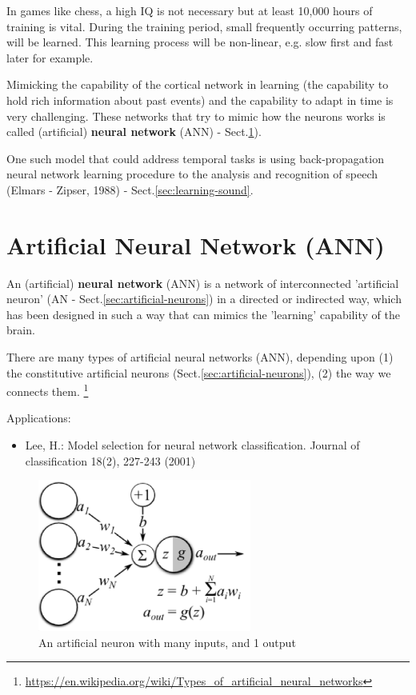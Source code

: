 In games like chess, a high IQ is not necessary but at least 10,000 hours of
training is vital. During the training period, small frequently occurring
patterns, will be learned. This learning process will be non-linear, e.g. slow
first and fast later for example.


Mimicking the capability of the cortical network in learning (the capability to
hold rich information about past events) and the capability to adapt in time is
very challenging. These networks that try to mimic how the neurons works is
called (artificial) {\bf neural network} (ANN) -
Sect.\ref{sec:ANN-articial-neuron-network}).


One such model that could address temporal tasks is using back-propagation
neural network learning procedure to the analysis and recognition of speech
(Elmars - Zipser, 1988) - Sect.\ref{sec:learning-sound}. 


\section{Artificial Neural Network (ANN)}
\label{sec:ANN-articial-neuron-network}

An (artificial) {\bf neural network} (ANN) is a network of interconnected
'artificial neuron' (AN - Sect.\ref{sec:artificial-neurons}) in a directed or
indirected way, which has been designed in such a way that can mimics the
'learning' capability of the brain.

There are many types of artificial neural networks (ANN), depending upon 
(1) the constitutive artificial neurons (Sect.\ref{sec:artificial-neurons}), 
(2) the way we connects them.
\footnote{\url{https://en.wikipedia.org/wiki/Types_of_artificial_neural_networks}}


Applications:
\begin{itemize}
  \item Lee, H.: Model selection for neural network classification.
Journal of classification 18(2), 227-243 (2001)
\end{itemize}

\begin{figure}[hbt]
  \centerline{\includegraphics[height=5cm,
    angle=0]{./images/ANN.eps}}
\caption{An artificial neuron with many inputs, and 1 output}
\label{fig:ANN}
\end{figure}


